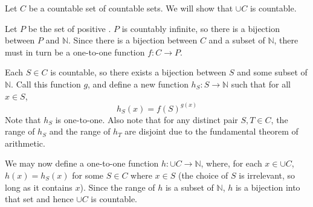 \documentclass{article}
\begin{document}

Let $C$ be a countable set of countable sets.  We will show that $\cup C$ is countable.

Let $P$ be the set of positive .  $P$ is countably infinite, so there is a bijection between $P$ and $\mathbb{N}$.  Since there is a bijection between $C$ and a subset of $\mathbb{N}$, there must in turn be a one-to-one function $f: C \rightarrow P$.

Each $S \in C$ is countable, so there exists a bijection between $S$ and some subset of $\mathbb{N}$.  Call this function $g$, and define a new function $h_S: S \rightarrow \mathbb{N}$ such that for all $x \in S$,
$$h_S(x) = f(S)^{g(x)}$$
Note that $h_S$ is one-to-one.  Also note that for any distinct pair $S, T \in C$, the range of $h_S$ and the range of $h_T$ are disjoint due to the fundamental theorem of arithmetic.

We may now define a one-to-one function $h: \cup C \rightarrow \mathbb{N}$, where, for each $x \in \cup C$, $h(x) = h_S(x)$ for some $S \in C$ where $x \in S$ (the choice of $S$ is irrelevant, so long as it contains $x$).  Since the range of $h$ is a subset of $\mathbb{N}$, $h$ is a bijection into that set and hence $\cup C$ is countable.
\end{document}
